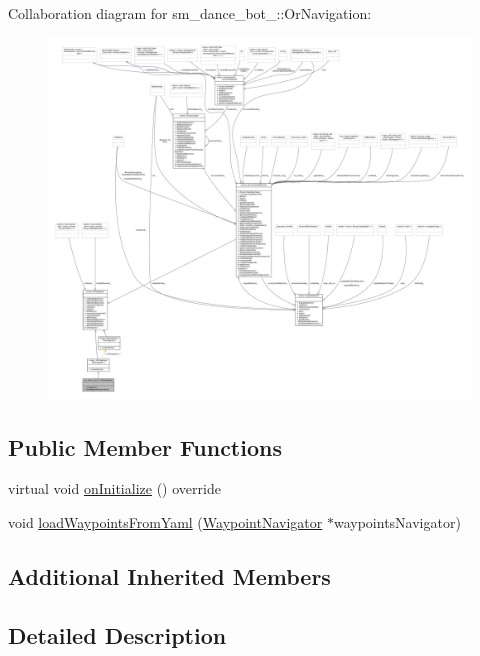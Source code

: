 Collaboration diagram for sm\+\_\+dance\+\_\+bot\+\_\+:\+:Or\+Navigation\+:
\nopagebreak
\begin{figure}[H]
\begin{center}
\leavevmode
\includegraphics[width=350pt]{classsm__dance__bot__3_1_1OrNavigation__coll__graph}
\end{center}
\end{figure}
\subsection*{Public Member Functions}
\begin{DoxyCompactItemize}
\item 
virtual void \hyperlink{classsm__dance__bot__3_1_1OrNavigation_a2e27474959307c770e0dbb524eece363}{on\+Initialize} () override
\item 
void \hyperlink{classsm__dance__bot__3_1_1OrNavigation_a6a236ec71d26fc0df79658f8e829c518}{load\+Waypoints\+From\+Yaml} (\hyperlink{classmove__base__z__client_1_1WaypointNavigator}{Waypoint\+Navigator} $\ast$waypoints\+Navigator)
\end{DoxyCompactItemize}
\subsection*{Additional Inherited Members}


\subsection{Detailed Description}



